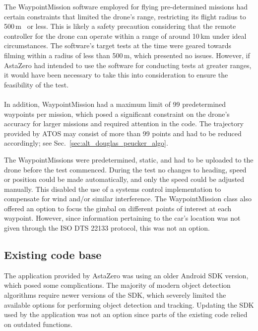 The WaypointMission software employed for flying pre-determined missions had certain constraints that limited the drone's range, restricting its flight radius to 500\,m~\cite{WaypointMission} or less. This is likely a safety precaution considering that the remote controller for the drone can operate within a range of around 10\,km under ideal circumstances. The software's target tests at the time were geared towards filming within a radius of less than 500\,m, which presented no issues. However, if AstaZero had intended to use the software for conducting tests at greater ranges, it would have been necessary to take this into consideration to ensure the feasibility of the test.
\\ \\
In addition, WaypointMission had a maximum limit of 99 predetermined waypoints per mission, which posed a significant constraint on the drone's accuracy for larger missions and required attention in the code. The trajectory provided by ATOS may consist of more than 99 points and had to be reduced accordingly; see Sec.~\ref{sec:alt_douglas_peucker_algo}. 
\newline

The WaypointMissions were predetermined, static, and had to be uploaded to the drone before the test commenced. During the test no changes to heading, speed or position could be made automatically, and only the speed could be adjusted manually. This disabled the use of a systems control implementation to compensate for wind and/or similar interference. The WaypointMission class also offered an option to focus the gimbal on different points of interest at each waypoint. However, since information pertaining to the car's location was not given through the ISO DTS 22133 protocol, this was not an option.
\subsection{Existing code base} \label{sec:existing_code_base}
The application provided by AstaZero was using an older Android SDK version, which posed some complications. The majority of modern object detection algorithms require newer versions of the SDK, which severely limited the available options for performing object detection and tracking. Updating the SDK used by the application was not an option since parts of the existing code relied on outdated functions.




